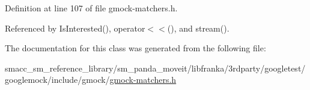 Definition at line 107 of file gmock-\/matchers.\+h.



Referenced by Is\+Interested(), operator$<$$<$(), and stream().



The documentation for this class was generated from the following file\+:\begin{DoxyCompactItemize}
\item 
smacc\+\_\+sm\+\_\+reference\+\_\+library/sm\+\_\+panda\+\_\+moveit/libfranka/3rdparty/googletest/googlemock/include/gmock/\hyperlink{gmock-matchers_8h}{gmock-\/matchers.\+h}\end{DoxyCompactItemize}
